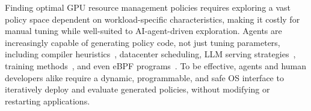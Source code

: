 Finding optimal GPU resource management policies requires exploring a vast policy space dependent on workload-specific characteristics, making it costly for manual tuning while well-suited to AI-agent-driven exploration. Agents are increasingly capable of generating policy code, not just tuning parameters, including compiler heuristics~\cite{alphaevolve2025}, datacenter scheduling, LLM serving strategies~\cite{hamadanian2025glia,cheng2025barbarians}, training methods~\cite{ding2025asap}, and even eBPF programs~\cite{dwivedula2025policysmith,zheng2025schedcp}. To be effective, agents and human developers alike require a dynamic, programmable, and safe OS interface to iteratively deploy and evaluate generated policies, without modifying or restarting applications.



